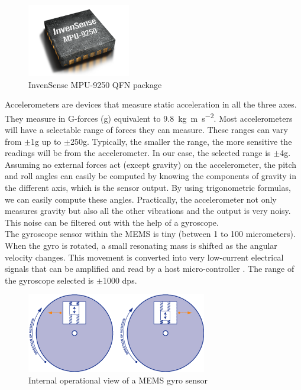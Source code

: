 \documentclass[a4paper,12pt,oneside]{book}
\begin{document}
\begin{figure}[!htb]
\centering
\includegraphics[width=0.4\textwidth]{images/mpu-9250}
\caption{InvenSense MPU-9250 QFN package\cite{mpu9250}}
\end{figure}

Accelerometers are devices that measure static acceleration in all the three axes. They measure in G-forces (g) equivalent to \SI{9.8}{\kilo\gram\meter\per\second\squared}. Most accelerometers will have a selectable range of forces they can measure. These ranges can vary from $\pm$1g up to $\pm$250g. Typically, the smaller the range, the more sensitive the readings will be from the accelerometer. In our case, the selected range is $\pm$4g.\cite{tonik}\\

Assuming no external forces act (except gravity) on the accelerometer, the pitch and roll angles can easily be computed by knowing the components of gravity in the different axis, which is the sensor output. By using trigonometric formulas, we can easily compute these angles. Practically, the accelerometer not only measures gravity but also all the other vibrations and the output is very noisy. This noise can be filtered out with the help of a gyroscope.\\

The gyroscope sensor within the MEMS is tiny (between 1 to 100 micrometers). When the gyro is rotated, a small resonating mass is shifted as the angular velocity changes. This movement is converted into very low-current electrical signals that can be amplified and read by a host micro-controller \cite{gyro}. The range of the gyroscope selected is $\pm$1000 dps.\\

\begin{figure}[!htb]
\centering
\includegraphics[width=0.7\textwidth]{images/gyro_mems}
\caption{Internal operational view of a MEMS gyro sensor\cite{gyro}}
\end{figure}
\end{document}
